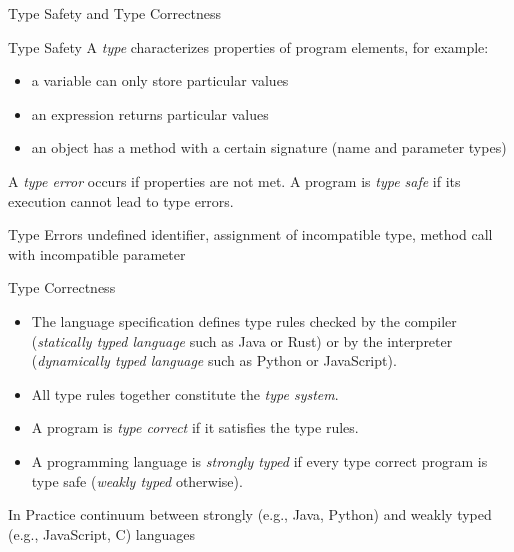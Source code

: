 \begin{frame}{Type Safety and Type Correctness}
	\begin{fancycolumns}[widths={45}]
		\begin{definition}{Type Safety}
			A \emph{type} characterizes properties of program elements, for example:
			\begin{itemize}
				\item a variable can only store particular values
				\item an expression returns particular values
				\item an object has a method with a certain signature (name and parameter types)
			\end{itemize}
			
			A \emph{type error} occurs if properties are not met. A program is \emph{type safe} if its execution cannot lead to type errors.
		\end{definition}
		\begin{example}{Type Errors}
			undefined identifier, assignment of incompatible type, method call with incompatible parameter
		\end{example}
		\nextcolumn
		\begin{definition}{Type Correctness}
			\begin{itemize}
				\item The language specification defines type rules checked by the compiler (\emph{statically typed language} such as Java or Rust) or by the interpreter (\emph{dynamically typed language} such as Python or JavaScript).
				\item All type rules together constitute the \emph{type system}.
				\item A program is \emph{type correct} if it satisfies the type rules.
				\item A programming language is \emph{strongly typed} if every type correct program is type safe (\emph{weakly typed} otherwise).
			\end{itemize}
		\end{definition}
		\begin{example}{In Practice}
			continuum between strongly (e.g., Java, Python) and weakly typed (e.g., JavaScript, C) languages
		\end{example}
	\end{fancycolumns}
\end{frame}